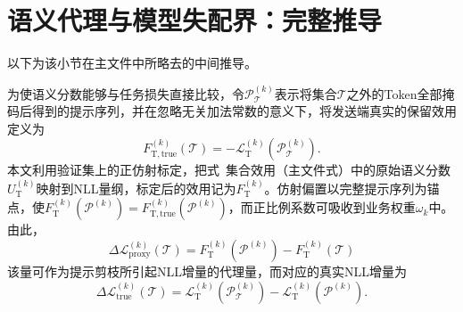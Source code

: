 \documentclass[journal]{IEEEtran}
\begin{document}


\section{语义代理与模型失配界：完整推导}

\noindent 以下为该小节在主文件中所略去的中间推导。


为使语义分数能够与任务损失直接比较，令$\mathcal P_{\mathcal T}^{(k)}$表示将集合$\mathcal T$之外的Token全部掩码后得到的提示序列，并在忽略无关加法常数的意义下，将发送端真实的保留效用定义为
\begin{equation}
F_{\mathrm T,\mathrm{true}}^{(k)}(\mathcal T)
=-\mathcal L_{\mathrm T}^{(k)}(\mathcal P_{\mathcal T}^{(k)}).
\label{eq:true_transmitter_utility}
\end{equation}
本文利用验证集上的正仿射标定，把式~集合效用（主文件式）中的原始语义分数$U_{\mathrm T}^{(k)}$映射到NLL量纲，标定后的效用记为$F_{\mathrm T}^{(k)}$。仿射偏置以完整提示序列为锚点，使$F_{\mathrm T}^{(k)}(\mathcal P^{(k)})=F_{\mathrm T,\mathrm{true}}^{(k)}(\mathcal P^{(k)})$，而正比例系数可吸收到业务权重$\omega_k$中。由此，
\begin{equation}
\Delta\mathcal L_{\mathrm{proxy}}^{(k)}(\mathcal T)
=F_{\mathrm T}^{(k)}(\mathcal P^{(k)})
-F_{\mathrm T}^{(k)}(\mathcal T)
\label{eq:calibrated_proxy_loss}
\end{equation}
该量可作为提示剪枝所引起NLL增量的代理量，而对应的真实NLL增量为
\begin{equation}
\Delta\mathcal L_{\mathrm{true}}^{(k)}(\mathcal T)
=\mathcal L_{\mathrm T}^{(k)}(\mathcal P_{\mathcal T}^{(k)})
-\mathcal L_{\mathrm T}^{(k)}(\mathcal P^{(k)}).
\label{eq:true_pruning_loss}
\end{equation}
\end{document}
